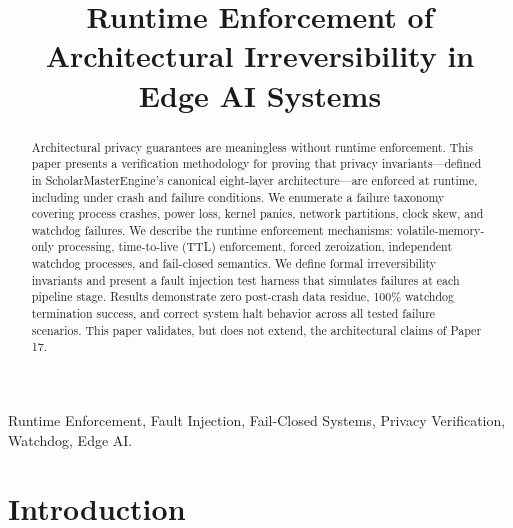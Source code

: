 \documentclass[conference]{IEEEtran}
\begin{document}
\title{Runtime Enforcement of Architectural Irreversibility in Edge AI Systems}

\author{
}

\maketitle

\begin{abstract}
Architectural privacy guarantees are meaningless without runtime enforcement. This paper presents a verification methodology for proving that privacy invariants—defined in ScholarMasterEngine's canonical eight-layer architecture—are enforced at runtime, including under crash and failure conditions. We enumerate a failure taxonomy covering process crashes, power loss, kernel panics, network partitions, clock skew, and watchdog failures. We describe the runtime enforcement mechanisms: volatile-memory-only processing, time-to-live (TTL) enforcement, forced zeroization, independent watchdog processes, and fail-closed semantics. We define formal irreversibility invariants and present a fault injection test harness that simulates failures at each pipeline stage. Results demonstrate zero post-crash data residue, 100\% watchdog termination success, and correct system halt behavior across all tested failure scenarios. This paper validates, but does not extend, the architectural claims of Paper 17.
\end{abstract}

\begin{IEEEkeywords}
Runtime Enforcement, Fault Injection, Fail-Closed Systems, Privacy Verification, Watchdog, Edge AI.
\end{IEEEkeywords}

\section{Introduction}
\end{document}
